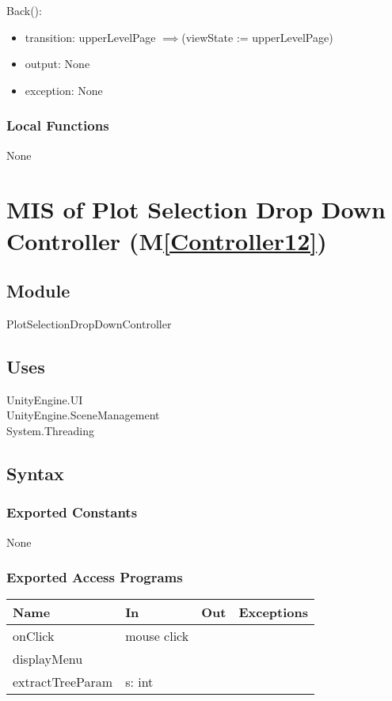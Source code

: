 \documentclass[12pt, titlepage]{article}
\newcommand{\mref}[1]{M\ref{#1}}
\begin{document}
\noindent Back():
\begin{itemize}
\item transition: upperLevelPage $\mathit{\implies}$(viewState := upperLevelPage)
\item output: None
\item exception: None
\end{itemize}

\subsubsection{Local Functions}
None


\newpage

\section{MIS of Plot Selection Drop Down Controller (\mref{Controller12})} 

\subsection{Module}
PlotSelectionDropDownController

\subsection{Uses}
UnityEngine.UI\\
UnityEngine.SceneManagement\\
System.Threading\\

\subsection{Syntax}
\subsubsection{Exported Constants}
None
\subsubsection{Exported Access Programs}

\begin{center}
\begin{tabular}{| l | l | l | p{5cm}|}
\hline
\textbf{Name} & \textbf{In} & \textbf{Out} & \textbf{Exceptions} \\
\hline
onClick & mouse click &  &  \\
\hline
displayMenu &&&\\
\hline
extractTreeParam & s: int &  &  \\
\hline
\end{tabular}
\end{center}
\end{document}
